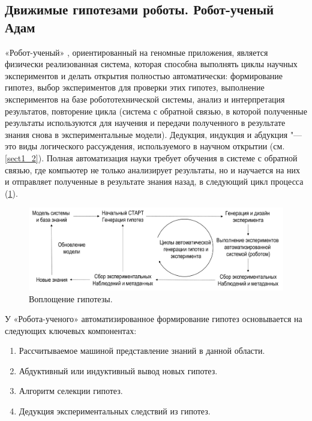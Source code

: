 \subsection{Движимые гипотезами роботы. Робот-ученый Адам}\label{sect1_3_2}
«Робот-ученый» \cite{king2009automation, sparkes2010towards}, ориентированный на геномные приложения, 
является физически реализованная система, которая способна выполнять циклы научных экспериментов и делать 
открытия полностью автоматически: формирование гипотез, выбор экспериментов для проверки этих гипотез, выполнение 
экспериментов на базе робототехнической системы, анализ и интерпретация результатов, повторение цикла (система с 
обратной связью, в которой полученные результаты используются для научения и передачи полученного в результате знания 
снова в экспериментальные модели). Дедукция, индукция и абдукция "--- это виды логического рассуждения, используемого 
в научном открытии (см. \cref{sect1_2}). Полная автоматизация науки требует обучения в системе с обратной связью, где 
компьютер не только анализирует результаты, но и научается на них и отправляет полученные в результате знания назад, 
в следующий цикл процесса (\cref{fig:RobotScientistCycle}).

\begin{figure}[ht]
    \centering
    \includegraphics[width=1.0\linewidth]{images/RobotScientistCycle.pdf}
    \caption{Воплощение гипотезы.}\label{fig:RobotScientistCycle}
\end{figure}

У «Робота-ученого» автоматизированное формирование гипотез основывается на следующих ключевых компонентах:

\begin{enumerate}
    \item Рассчитываемое машиной представление знаний в данной области.
    \item Абдуктивный или индуктивный вывод новых гипотез.
    \item Алгоритм селекции гипотез.
    \item Дедукция экспериментальных следствий из гипотез.
\end{enumerate}	

